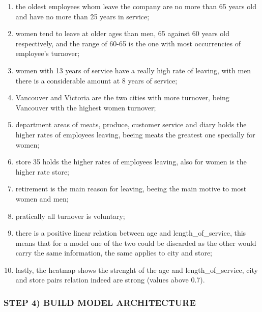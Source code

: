 \documentclass[11pt]{article}
\providecommand{\tightlist}{%
      \setlength{\itemsep}{0pt}\setlength{\parskip}{0pt}}
\begin{document}
\begin{enumerate}
\def\labelenumi{\arabic{enumi})}
\tightlist
\item
  the oldest employees whom leave the company are no more than 65 years
  old and have no more than 25 years in service;\\
\item
  women tend to leave at older ages than men, 65 against 60 years old
  respectively, and the range of 60-65 is the one with most occurrencies
  of employee's turnover;\\
\item
  women with 13 years of service have a really high rate of leaving,
  with men there is a considerable amount at 8 years of service;\\
\item
  Vancouver and Victoria are the two cities with more turnover, being
  Vancouver with the highest women turnover;\\
\item
  department areas of meats, produce, customer service and diary holds
  the higher rates of employees leaving, beeing meats the greatest one
  specially for women;\\
\item
  store 35 holds the higher rates of employees leaving, also for women
  is the higher rate store;\\
\item
  retirement is the main reason for leaving, beeing the main motive to
  most women and men;\\
\item
  pratically all turnover is voluntary;\\
\item
  there is a positive linear relation between age and
  length\_of\_service, this means that for a model one of the two could
  be discarded as the other would carry the same information, the same
  applies to city and store;\\
\item
  lastly, the heatmap shows the strenght of the age and
  length\_of\_service, city and store pairs relation indeed are strong
  (values above 0.7).
\end{enumerate}

    \subsubsection{STEP 4) BUILD MODEL
ARCHITECTURE}\label{step-4-build-model-architecture}
\end{document}
